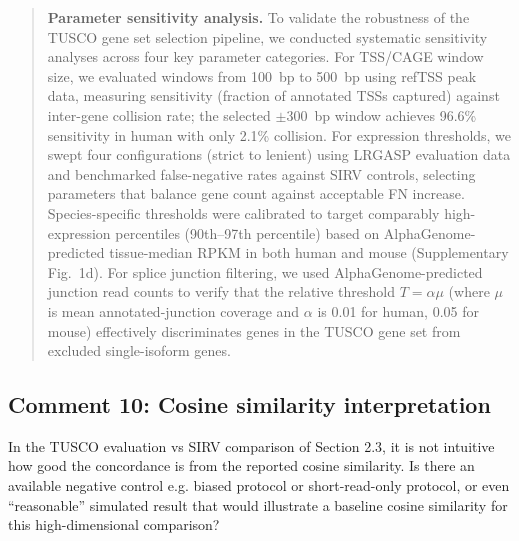 \documentclass[11pt]{article}
\newcommand{\tuscoGeneSet}{TUSCO gene set}
\begin{document}
\begin{responseboxnew}
\begin{quote}
\textbf{Parameter sensitivity analysis.} To validate the robustness of the \tuscoGeneSet{} selection pipeline, we conducted systematic sensitivity analyses across four key parameter categories. For TSS/CAGE window size, we evaluated windows from 100~bp to 500~bp using refTSS peak data, measuring sensitivity (fraction of annotated TSSs captured) against inter-gene collision rate; the selected $\pm 300$~bp window achieves 96.6\% sensitivity in human with only 2.1\% collision. For expression thresholds, we swept four configurations (strict to lenient) using LRGASP evaluation data and benchmarked false-negative rates against SIRV controls, selecting parameters that balance gene count against acceptable FN increase. Species-specific thresholds were calibrated to target comparably high-expression percentiles (90th--97th percentile) based on AlphaGenome-predicted tissue-median RPKM in both human and mouse (Supplementary Fig.~1d). For splice junction filtering, we used AlphaGenome-predicted junction read counts to verify that the relative threshold $T = \alpha\mu$ (where $\mu$ is mean annotated-junction coverage and $\alpha$ is 0.01 for human, 0.05 for mouse) effectively discriminates genes in the \tuscoGeneSet{} from excluded single-isoform genes.
\end{quote}
\end{responseboxnew}

\subsection{Comment 10: Cosine similarity interpretation}

\begin{reviewercomment}
In the TUSCO evaluation vs SIRV comparison of Section 2.3, it is not intuitive how good the concordance is from the reported cosine similarity. Is there an available negative control e.g. biased protocol or short-read-only protocol, or even ``reasonable'' simulated result that would illustrate a baseline cosine similarity for this high-dimensional comparison?
\end{reviewercomment}
\end{document}
